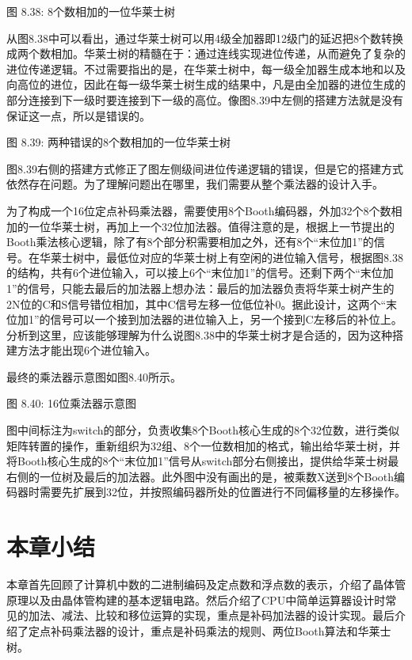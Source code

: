 \documentclass[]{ctexbook}
\begin{document}
图 8.38: 8个数相加的一位华莱士树

从图8.38中可以看出，通过华莱士树可以用4级全加器即12级门的延迟把8个数转换成两个数相加。华莱士树的精髓在于：通过连线实现进位传递，从而避免了复杂的进位传递逻辑。不过需要指出的是，在华莱士树中，每一级全加器生成本地和以及向高位的进位，因此在每一级华莱士树生成的结果中，凡是由全加器的进位生成的部分连接到下一级时要连接到下一级的高位。像图8.39中左侧的搭建方法就是没有保证这一点，所以是错误的。

图 8.39: 两种错误的8个数相加的一位华莱士树

图8.39右侧的搭建方式修正了图左侧级间进位传递逻辑的错误，但是它的搭建方式依然存在问题。为了理解问题出在哪里，我们需要从整个乘法器的设计入手。

为了构成一个16位定点补码乘法器，需要使用8个Booth编码器，外加32个8个数相加的一位华莱士树，再加上一个32位加法器。值得注意的是，根据上一节提出的Booth乘法核心逻辑，除了有8个部分积需要相加之外，还有8个``末位加1''的信号。在华莱士树中，最低位对应的华莱士树上有空闲的进位输入信号，根据图8.38的结构，共有6个进位输入，可以接上6个``末位加1''的信号。还剩下两个``末位加1''的信号，只能去最后的加法器上想办法：最后的加法器负责将华莱士树产生的2N位的C和S信号错位相加，其中C信号左移一位低位补0。据此设计，这两个``末位加1''的信号可以一个接到加法器的进位输入上，另一个接到C左移后的补位上。分析到这里，应该能够理解为什么说图8.38中的华莱士树才是合适的，因为这种搭建方法才能出现6个进位输入。

最终的乘法器示意图如图8.40所示。

图 8.40: 16位乘法器示意图

图中间标注为switch的部分，负责收集8个Booth核心生成的8个32位数，进行类似矩阵转置的操作，重新组织为32组、8个一位数相加的格式，输出给华莱士树，并将Booth核心生成的8个``末位加1''信号从switch部分右侧接出，提供给华莱士树最右侧的一位树及最后的加法器。此外图中没有画出的是，被乘数X送到8个Booth编码器时需要先扩展到32位，并按照编码器所处的位置进行不同偏移量的左移操作。

\hypertarget{ux672cux7ae0ux5c0fux7ed3-7}{%
\section{本章小结}\label{ux672cux7ae0ux5c0fux7ed3-7}}

本章首先回顾了计算机中数的二进制编码及定点数和浮点数的表示，介绍了晶体管原理以及由晶体管构建的基本逻辑电路。然后介绍了CPU中简单运算器设计时常见的加法、减法、比较和移位运算的实现，重点是补码加法器的设计实现。最后介绍了定点补码乘法器的设计，重点是补码乘法的规则、两位Booth算法和华莱士树。
\end{document}
